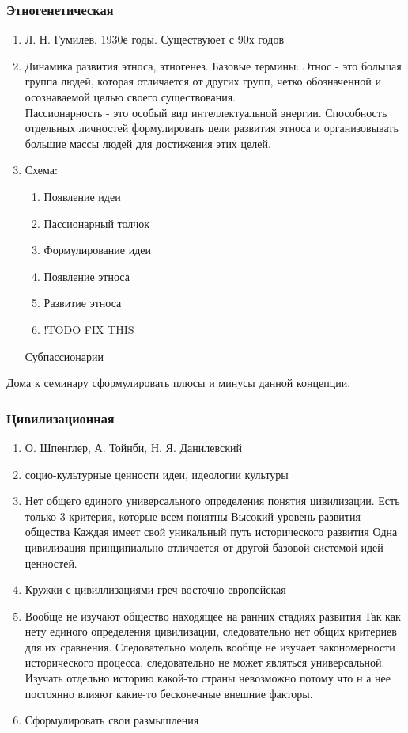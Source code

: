 \documentclass[a4paper]{article}
\begin{document}
\subsubsection{Этногенетическая}
\begin{enumerate}
\item Л. Н. Гумилев. 1930е годы. Существуюет с 90х годов
\item Динамика развития этноса, этногенез. Базовые термины:
    Этнос - это большая группа людей, которая отличается от других групп, четко обозначенной и осознаваемой целью своего существования. \\
    Пассионарность - это особый вид интеллектуальной энергии. Способность отдельных личностей формулировать цели развития этноса и организовывать большие массы людей для достижения этих целей.
\item Схема:
    \begin{enumerate}
        \item Появление идеи
        \item Пассионарный толчок
        \item Формулирование идеи
        \item Появление этноса
        \item Развитие этноса
        \item !TODO FIX THIS
    \end{enumerate}
    Субпассионарии
\end{enumerate}

Дома к семинару сформулировать плюсы и минусы данной концепции.

\subsubsection{Цивилизационная}
\begin{enumerate}
    \item О. Шпенглер, А. Тойнби, Н. Я. Данилевский
    \item социо-культурные ценности идеи, идеологии культуры
    \item Нет общего единого универсального определения понятия цивилизации. Есть только 3 критерия, которые всем понятны
    Высокий уровень развития общества
    Каждая имеет свой уникальный путь исторического развития
    Одна цивилизация принципиально отличается от другой базовой системой идей ценностей.
    \item Кружки с цивиллизациями греч восточно-европейская
    \item Вообще не изучают общество находящее на ранних стадиях развития
    Так как нету единого определения цивилизации, следовательно нет общих критериев для их сравнения. Следовательно модель вообще не изучает закономерности исторического процесса, следовательно не может являться универсальной.
    Изучать отдельно историю какой-то страны невозможно потому что н а нее постоянно влияют какие-то бесконечные внешние факторы.
    \item Сформулировать свои размышления
\end{enumerate}
\end{document}
